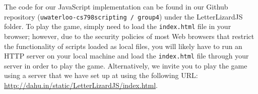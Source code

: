 The code for our JavaScript implementation can be found in our Github repository
(\texttt{uwaterloo-cs798scripting / group4}) under the LetterLizardJS folder. To play the
game, simply need to load the \texttt{index.html} file in your browser; however,
due to the security policies of most Web browsers that restrict the functionality
of scripts loaded as local files, you will likely have to run an
HTTP server on your local machine and load the \texttt{index.html} file through
your server in order to play the game. Alternatively, we invite you to play the
game using a server that we have set up at using the following URL: 
\url{http://dahu.in/static/LetterLizardJS/index.html}.

